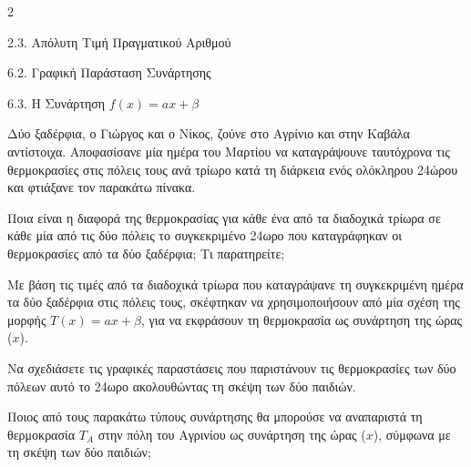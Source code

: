 \begin{ylh}{2}
    \item 2.3. Απόλυτη Τιμή Πραγματικού Αριθμού
    \item 6.2. Γραφική Παράσταση Συνάρτησης
    \item 6.3. Η Συνάρτηση $f(x)=ax+\beta$
\end{ylh}
Δύο ξαδέρφια, ο Γιώργος και ο Νίκος, ζούνε στο Αγρίνιο και στην Καβάλα αντίστοιχα. Αποφασίσανε μία ημέρα του Μαρτίου να καταγράψουνε ταυτόχρονα τις θερμοκρασίες στις πόλεις τους ανά τρίωρο κατά τη διάρκεια ενός ολόκληρου 24ώρου και φτιάξανε τον παρακάτω πίνακα.

{
\begin{alist}
\item Ποια είναι η διαφορά της θερμοκρασίας για κάθε ένα από τα διαδοχικά τρίωρα σε κάθε μία από τις δύο πόλεις το συγκεκριμένο 24ωρο που καταγράφηκαν οι θερμοκρασίες από τα δύο ξαδέρφια; Τι παρατηρείτε;
\item Με βάση τις τιμές από τα διαδοχικά τρίωρα που καταγράψανε τη συγκεκριμένη ημέρα τα δύο ξαδέρφια στις πόλεις τους, σκέφτηκαν να χρησιμοποιήσουν από μία σχέση της μορφής $T(x) = ax + \beta$, για να εκφράσουν τη θερμοκρασία ως συνάρτηση της ώρας ($x$).

\begin{rlist}[leftmargin=3mm]
\item Να σχεδιάσετε τις γραφικές παραστάσεις που παριστάνουν τις θερμοκρασίες των δύο πόλεων αυτό το 24ωρο ακολουθώντας τη σκέψη των δύο παιδιών.
\item Ποιος από τους παρακάτω τύπους συνάρτησης θα μπορούσε να αναπαριστά τη θερμοκρασία $T_{A}$ στην πόλη του Αγρινίου ως συνάρτηση της ώρας ($x$), σύμφωνα με τη σκέψη των δύο παιδιών;

\end{rlist}
\end{alist}}

